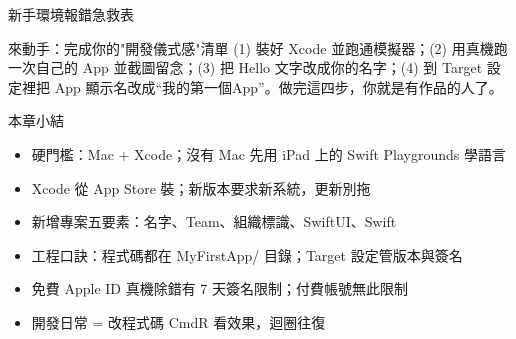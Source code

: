\begin{center}\small\color{gray}新手環境報錯急救表\end{center}

\begin{tcbpractice}{來動手：完成你的"開發儀式感"清單}
(1) 裝好 Xcode 並跑通模擬器；(2) 用真機跑一次自己的 App 並截圖留念；(3) 把 Hello 文字改成你的名字；(4) 到 Target 設定裡把 App 顯示名改成“我的第一個App”。做完這四步，你就是有作品的人了。

\end{tcbpractice}

\begin{tcbsummary}{本章小結}
\begin{itemize}
  \item 硬門檻：Mac + Xcode；沒有 Mac 先用 iPad 上的 Swift Playgrounds 學語言
  \item Xcode 從 App Store 裝；新版本要求新系統，更新別拖
  \item 新增專案五要素：名字、Team、組織標識、SwiftUI、Swift
  \item 工程口訣：程式碼都在 MyFirstApp/ 目錄；Target 設定管版本與簽名
  \item 免費 Apple ID 真機除錯有 7 天簽名限制；付費帳號無此限制
  \item 開發日常 = 改程式碼 CmdR 看效果，迴圈往復
\end{itemize}

\end{tcbsummary}
